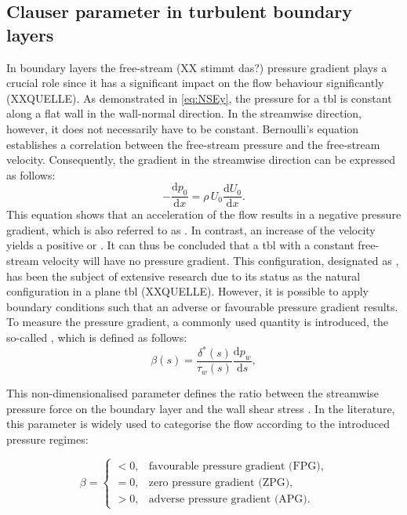 \subsection{Clauser parameter in turbulent boundary layers}

In boundary layers the free-stream (XX stimmt das?) pressure gradient plays a crucial role since it has a significant impact on the flow behaviour significantly (XXQUELLE).
As demonstrated in \autoref{eq:NSEy}, the pressure for a \acrshort{tbl} is constant along a flat wall  in the wall-normal direction.
In the streamwise direction, however, it does not necessarily have to be constant.
Bernoulli's equation establishes a correlation between the free-stream pressure and the free-stream velocity. Consequently, the gradient in the streamwise direction can be expressed as follows:
\begin{equation}\label{eq:bernoulli}
    -\frac{\mathrm{d}p_0}{\mathrm{d}x} = \rho\, U_0 \frac{\mathrm{d}U_0}{\mathrm{d}x}.
\end{equation}
This equation shows that an acceleration of the flow results in a negative pressure gradient, which is also referred to as  . 
In contrast, an increase of the velocity  yields a positive or . 
It can thus be concluded that a \acrshort{tbl} with a constant free-stream velocity will have no pressure gradient.
This configuration, designated as , has been the subject of extensive research due to its status as the natural configuration in a plane \acrshort{tbl}  (XXQUELLE).
However, it is possible to apply boundary conditions such that an adverse or favourable pressure gradient results.
To measure the pressure gradient, a commonly used quantity is introduced,  the so-called , which is defined as follows:
\begin{equation}\label{eq:beta}
    \beta(s) = \frac{\delta^*(s)}{\tau_w(s)} \frac{\mathrm{d}p_w}{\mathrm{d}s},
\end{equation}

This non-dimensionalised parameter defines the ratio between the streamwise pressure force on the boundary layer and the wall shear stress \citep{clauser_turbulent_1954}.
In the literature, this parameter is widely used to categorise the flow according to the introduced pressure regimes:

\begin{equation}
    \beta =
    \begin{cases}
        < 0, & \text{favourable pressure gradient (FPG)}, \\
        = 0, & \text{zero pressure gradient (ZPG)}, \\
        > 0, & \text{adverse pressure gradient (APG)}.
    \end{cases}
\end{equation}




